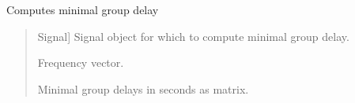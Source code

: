 \documentclass[letterpaper,10pt,english]{sphinxmanual}
\begin{document}
\begin{fulllineitems}
\label{\detokenize{modules/dsptools.standard_functions:dsptools.standard_functions.minimal_group_delay}}
\pysigstartsignatures
{}
\pysigstopsignatures
\sphinxAtStartPar
Computes minimal group delay
\begin{quote}\begin{description}
\begin{description}
\sphinxlineitem{\sphinxstylestrong{signal}}{[}Signal{]}
\sphinxAtStartPar
Signal object for which to compute minimal group delay.

\end{description}

\begin{description}
\sphinxlineitem{\sphinxstylestrong{f}}{[}\sphinxtitleref{np.ndarray}{]}
\sphinxAtStartPar
Frequency vector.

\sphinxlineitem{\sphinxstylestrong{min\_gd}}{[}\sphinxtitleref{np.ndarray}{]}
\sphinxAtStartPar
Minimal group delays in seconds as matrix.

\end{description}

\end{description}\end{quote}

\end{fulllineitems}

\end{document}
